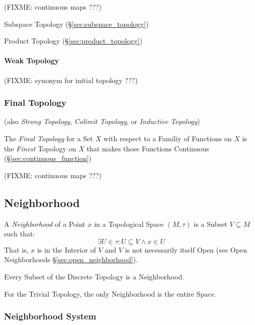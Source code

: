 (FIXME: continuous maps ???)

Subspace Topology (\S\ref{sec:subspace_topology})

Product Topology (\S\ref{sec:product_topology})



\paragraph{Weak Topology}\label{sec:weak_topology}

(FIXME: synonym for initial topology ???)



\subsubsection{Final Topology}\label{sec:final_topology}

(also \emph{Strong Topology}, \emph{Colimit Topology}, or
\emph{Inductive Topology})

The \emph{Final Topology} for a Set $X$ with respect to a Familiy of
Functions on $X$ is the \emph{Finest} Topology on $X$ that makes those
Functions Continuous (\S\ref{sec:continuous_function})

(FIXME: continuous maps ???)



\subsection{Neighborhood}\label{sec:neighborhood}

A \emph{Neighborhood} of a Point $x$ in a Topological Space $(M,\tau)$
is a Subset $V \subseteq M$ such that:
\[
  \exists U \in \tau : U \subseteq V \wedge x \in U
\]
That is, $x$ is in the Interior of $V$ and $V$ is not necessarily
itself Open (see Open Neighborhoods \S\ref{sec:open_neighborhood}).

Every Subset of the Discrete Topology is a Neighborhood.

For the Trivial Topology, the only Neighborhood is the entire Space.



\subsubsection{Neighborhood System}\label{sec:neighborhood_system}

